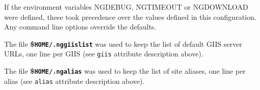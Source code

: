 If the environment variables NGDEBUG, NGTIMEOUT or NGDOWNLOAD were
defined, these took precedence over the values defined in this
configuration. Any command line options override the defaults.

The file \textbf{{\$}\texttt{HOME/.nggiislist}} was used to keep the
list of default GIIS server URLs, one line per GIIS (see \texttt{giis}
attribute description above). 

The file \textbf{{\$}\texttt{HOME/.ngalias}} was used to keep the
list of site aliases, one line per alias (see \texttt{alias}
attribute description above). 
